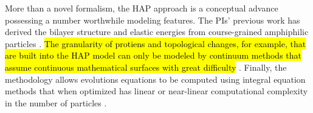 More than a novel formalism, the HAP approach
is a conceptual advance possessing a number
worthwhile modeling features.
The PIs' previous work has derived the bilayer structure
and elastic energies from course-grained amphiphilic particles
\cite{Fu2018_SIAM,FuQuRyYo20,Hamm2000,TerziDeserno17, PhysRevE.102.042406}.
\hl{The granularity of protiens and topological changes, for example,
that are built into the HAP model can only be modeled by
continuum methods that assume continuous mathematical surfaces
with great difficulty}
\cite{DuLiuWang2004_JCP,BibenKassnerMisbah2005_PRE,DoyeuxGuyotChabannesEtAl2013_JCAM, Shravan09,Rahimian15,KimLai2010_JCP,KimLai2012_PRE,HuLaiSeolEtAl2016_JCP,Bartels,Peng13,RyKlYaCo16,Sinha15, Du05,QiangDu08,Lowengrub13, Hu,Hu13, KimLai2010_JCP,doi:10.1063/5.0009734, LiAn-Chang16,doi:10.1098/rspa.2012.0505, doi:10.1137/130941432, Feetzl18,doi:10.1137/16M1108406}.
Finally, the methodology allows evolutions equations to be computed
using integral equation methods that when optimized has
linear or near-linear computational complexity in the number of particles 
\cite{fmm1, fmm2, fmm3, fmm4, fmm5, fmm6, fmm7, fmm8}.

